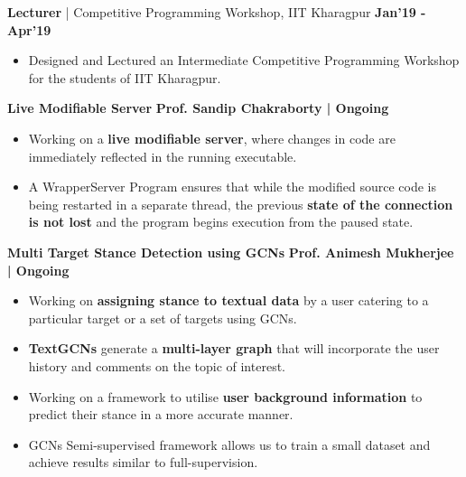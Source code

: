 \documentclass[10pt]{article}
\begin{document}
\large { \textbf{Lecturer} | Competitive Programming Workshop, IIT Kharagpur} \normalsize
\href{https://github.com/shmundhra/Credentials/tree/master/Teaching\%20Ventures} {\hspace{0.5ex}\faMousePointer}
{\hfill} \textbf{Jan'19 - Apr'19}\\[-1.9em]
\begin{itemize}
    \item Designed and Lectured an Intermediate Competitive Programming Workshop for the students of IIT Kharagpur.\\[-2em]
\end{itemize}

\vspace{-0.5ex}
\spacedhrule{0.15ex}{1.0ex}
\large {\textbf{Live Modifiable Server}} \normalsize \href{}{} {\hfill} \textbf{Prof. Sandip Chakraborty | Ongoing}\\[-1.75em]
\begin{itemize}
    \item Working on a \textbf{live modifiable server}, where changes in code are immediately reflected in the running executable.\\[-1.9em]
    \item A WrapperServer Program ensures that while the modified source code is being restarted in a separate thread, the previous \textbf{state of the connection is not lost} and the program begins execution from the paused state.\\[-1em]
\end{itemize}
\large {\textbf{Multi Target Stance Detection using GCNs}} \normalsize \href{}{} {\hfill} \textbf{Prof. Animesh Mukherjee | Ongoing}\\[-1.75em]
\begin{itemize}
    \item Working on \textbf{assigning stance to textual data} by a user catering to a particular target or a set of targets using GCNs.\\[-1.9em]
    \item \textbf{TextGCNs} generate a \textbf{multi-layer graph} that will incorporate the user history and comments on the topic of interest.\\[-1.9em]
    \item Working on a framework to utilise \textbf{user background information} to predict their stance in a more accurate manner. \\[-1.9em]
    \item GCNs {Semi-supervised framework} allows us to train a small dataset and achieve results similar to full-supervision.\\[-1em]
\end{itemize}
\end{document}
